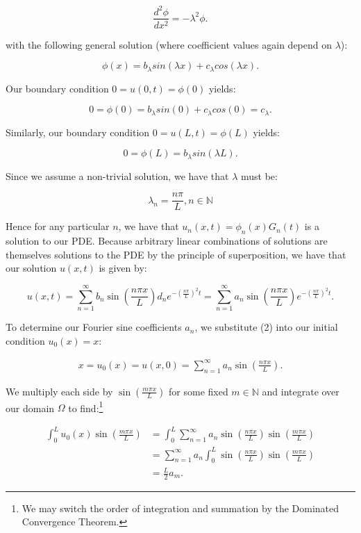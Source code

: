 \begin{solution}
    $$
    \frac{d^2 \phi}{d x^2} = -\lambda^2 \phi.
    $$

    with the following general solution (where coefficient values again depend on $\lambda$):

    $$
    \phi(x) = b_{\lambda} sin(\lambda x) + c_{\lambda} cos(\lambda x).
    $$

    Our boundary condition $0 = u(0, t) = \phi(0)$ yields:

    $$
    0 = \phi(0) = b_{\lambda} sin(0) + c_{\lambda} cos(0) = c_{\lambda}.
    $$

    Similarly, our boundary condition $0 = u(L, t) = \phi(L)$ yields:

    $$
    0 = \phi(L) = b_{\lambda} sin(\lambda L).
    $$

    Since we assume a non-trivial solution, we have that $\lambda$ must be:

    $$
    \lambda_n = \frac{n \pi}{L}, n \in \mathbb{N}
    $$

    Hence for any particular $n$, we have that $u_n(x, t) = \phi_n(x)G_n(t)$ is a solution to our PDE. Because arbitrary
    linear combinations of solutions are themselves solutions to the PDE by the principle of superposition, we have that
    our solution $u(x, t)$ is given by:

    \begin{equation}
    u(x, t) = \sum\limits_{n=1}^{\infty}{b_n \sin\left(\frac{n \pi x}{L}\right)} d_n e^{-\left(\frac{n \pi}{L}\right)^2 t}
            = \sum\limits_{n=1}^{\infty}{a_n \sin\left(\frac{n \pi x}{L}\right)} e^{-\left(\frac{n \pi}{L}\right)^2 t}.
    \end{equation}

    To determine our Fourier sine coefficients $a_n$, we substitute (2) into our initial condition $u_0(x) = x$:

    \begin{align*}
        x = u_0(x) = u(x, 0) = \sum\limits_{n=1}^{\infty}{a_n \sin\left(\frac{n \pi x}{L}\right)}.
    \end{align*}

    We multiply each side by $\sin\left(\frac{m \pi x}{L}\right)$ for some fixed $m \in \mathbb{N}$ and integrate over 
    our domain $\Omega$ to find:\footnote{
        We may switch the order of integration and summation by the Dominated Convergence Theorem.
    }

    \begin{align*}
        \int_{0}^{L}{u_0(x) \sin{\left(\frac{m \pi x}{L}\right)}} 
            &= \int_{0}^{L}{\sum\limits_{n=1}^{\infty}{a_n \sin\left(\frac{n \pi x}{L}\right) \sin\left(\frac{m \pi x}{L}\right) }} \\
            &= \sum\limits_{n=1}^{\infty}{a_n \int_{0}^{L}{\sin\left(\frac{n \pi x}{L}\right) \sin\left(\frac{m \pi x}{L}\right) }} \\
            &= \frac{L}{2} a_m.
    \end{align*}


\end{solution}
